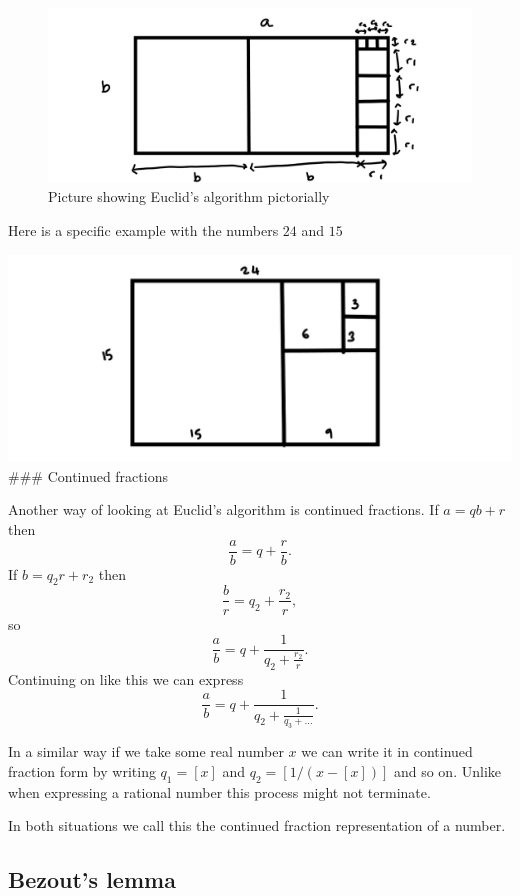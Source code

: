 \documentclass[
]{book}
\theoremstyle{definition}
\theoremstyle{definition}
\theoremstyle{definition}
\theoremstyle{definition}
\theoremstyle{remark}
\begin{document}
\begin{figure}
\centering
\includegraphics{geomeuclid.png}
\caption{\label{fig:unnamed-chunk-28}Picture showing Euclid's algorithm pictorially}
\end{figure}

Here is a specific example with the numbers \(24\) and \(15\)

\includegraphics{geomeuclidnumbers.png}
\#\#\# Continued fractions

Another way of looking at Euclid's algorithm is continued fractions. If \(a = qb+r\) then
\[ \frac{a}{b} = q + \frac{r}{b}.  \]
If \(b = q_2 r + r_2\) then
\[  \frac{b}{r} = q_2 + \frac{r_2}{r},\] so
\[ \frac{a}{b} = q + \frac{1}{q_2 + \frac{r_2}{r}}.  \]
Continuing on like this we can express
\[ \frac{a}{b} = q + \frac{1}{q_2 + \frac{1}{q_3 + \dots}}.  \]

In a similar way if we take some real number \(x\) we can write it in continued fraction form by writing \(q_1 = [x]\) and \(q_2 = [1/(x-[x])]\) and so on. Unlike when expressing a rational number this process might not terminate.

In both situations we call this the continued fraction representation of a number.

\subsection{Bezout's lemma}\label{bezouts-lemma}
\end{document}
